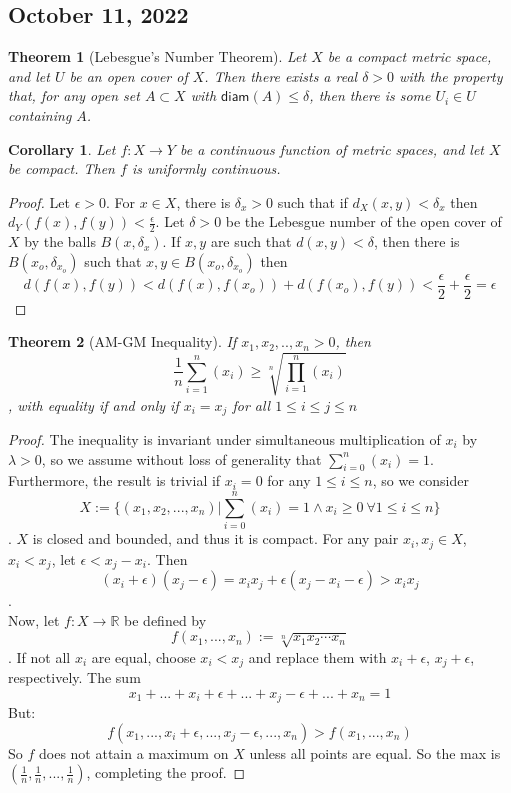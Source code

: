 \documentclass{article}
\newcommand{\R}{\mathbb{R}}
\newtheorem{theorem}{Theorem}
\newtheorem{corollary}{Corollary}
\begin{document}
\subsection{October 11, 2022}
\begin{theorem}[Lebesgue's Number Theorem]
	Let $X$ be a compact metric space, and let $U$ be an open cover of $X$.  Then there exists a real $\delta>0$ with the property that, for any open set $A\subset X$ with $\textsf{diam}(A)\leq\delta$, then there is some $U_i\in U$ containing $A$.
\end{theorem}
\begin{corollary}
	Let $f: X\rightarrow Y$ be a continuous function of metric spaces, and let $X$ be compact.  Then $f$ is uniformly continuous.
\end{corollary}
\begin{proof}
	Let $\epsilon>0$.  For $x\in X$, there is $\delta_x>0$ such that if $d_X(x,y)<\delta_x$ then $d_Y(f(x),f(y))<\frac{\epsilon}{2}$.  Let $\delta>0$ be the Lebesgue number of the open cover of $X$ by the balls $B(x,\delta_x)$.  If $x,y$ are such that $d(x,y)<\delta$, then there is $B(x_o,\delta_{x_o})$ such that $x,y\in B(x_o,\delta_{x_o})$ then $$d(f(x),f(y))<d(f(x),f(x_o))+d(f(x_o),f(y))<\frac{\epsilon}{2}+\frac{\epsilon}{2}=\epsilon$$
\end{proof}
\begin{theorem}[AM-GM Inequality]
	If $x_1,x_2,..,x_n >0$, then 
	\begin{equation}
	\frac{1}{n}\sum_{i=1}^n(x_i) \geq \sqrt[n]{\prod_{i=1}^n(x_i)}
	\end{equation}, with equality if and only if $x_i=x_j$ for all $1\leq i\leq j\leq n$
\end{theorem}
\begin{proof}
	The inequality is invariant under simultaneous multiplication of $x_i$ by $\lambda >0$, so we assume without loss of generality that $\sum_{i=0}^n(x_i)=1$.  Furthermore, the result is trivial if $x_i=0$ for any $1\leq i\leq n$, so we consider $$X:=\{(x_1,x_2,...,x_n)|\sum_{i=0}^n(x_i)=1\land x_i\geq0\:\forall 1\leq i\leq n\}$$.  $X$ is closed and bounded, and thus it is compact.  For any pair $x_i, x_j\in X$, $x_i<x_j$, let $\epsilon<x_j-x_i$.  Then $$(x_i+\epsilon)(x_j-\epsilon) = x_ix_j + \epsilon(x_j-x_i-\epsilon) > x_ix_j$$.\\ Now, let $f:X\rightarrow \R$ be defined by $$f(x_1,...,x_n) := \sqrt[n]{x_1x_2\cdots x_n}$$.  If not all $x_i$ are equal, choose $x_i<x_j$ and replace them with $x_i+\epsilon$, $x_j+\epsilon$, respectively.  The sum $$x_1+...+x_i+\epsilon+...+x_j-\epsilon+...+x_n=1$$But: $$f(x_1,...,x_i+\epsilon,...,x_j-\epsilon,...,x_n)>f(x_1,...,x_n)$$So $f$ does not attain a maximum on $X$ unless all points are equal.  So the max is $(\frac{1}{n},\frac{1}{n},...,\frac{1}{n})$, completing the proof.
\end{proof}
\end{document}
